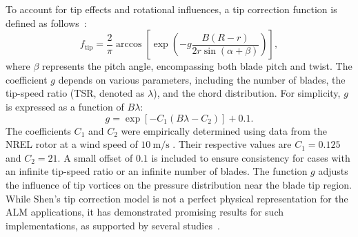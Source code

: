 \documentclass[11pt,a4paper]{article}
\begin{document}
%
To account for tip effects and rotational influences, a tip correction function is defined as follows~\citep{shen2012actuator}:
\[
f_{\text{tip}} = \frac{2}{\pi} \arccos \left[\exp \left(-g \frac{B(R-r)}{2 r \sin (\alpha+\beta)}\right)\right],
\]
where $\beta$ represents the pitch angle, encompassing both blade pitch and twist. The coefficient $g$ depends on various parameters, including the number of blades, the tip-speed ratio (TSR, denoted as $\lambda$), and the chord distribution. For simplicity, $g$ is expressed as a function of $B\lambda$:
\[
g = \exp \left[-C_1\left(B \lambda - C_2\right)\right] + 0.1.
\]
The coefficients $C_1$ and $C_2$ were empirically determined using data from the NREL rotor at a wind speed of $10~\mathrm{m/s}$ \citep{shen2005tip}. Their respective values are $C_1 = 0.125$ and $C_2 = 21$. A small offset of $0.1$ is included to ensure consistency for cases with an infinite tip-speed ratio or an infinite number of blades. The function $g$ adjusts the influence of tip vortices on the pressure distribution near the blade tip region. While Shen's tip correction model is not a perfect physical representation for the ALM applications, it has demonstrated promising results for such implementations, as supported by several studies~\citep{shen2014study,yu2018study,papi2021development}.





\end{document}
